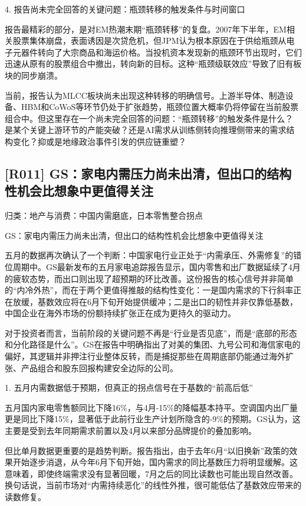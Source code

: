 \documentclass[11pt]{ctexart}
\begin{document}
4. 报告尚未完全回答的关键问题：瓶颈转移的触发条件与时间窗口

报告最精彩的部分，是对EM热潮末期“瓶颈转移”的复盘。2007年下半年，EM相关股票集体崩盘，表面诱因是次贷危机，但JPM认为根本原因在于供给瓶颈从电子元器件转向了大宗商品和海运价格。当投机资本发现新的瓶颈环节出现时，它们迅速从原有的股票组合中撤出，转向新的目标。这种“瓶颈级联效应”导致了旧有板块的同步崩溃。

当前，报告认为MLCC板块尚未出现这种转移的明确信号。上游半导体、制造设备、HBM和CoWoS等环节仍处于扩张趋势，瓶颈位置大概率仍将停留在当前股票组合中。但这里存在一个尚未完全回答的问题：“瓶颈转移”的触发条件是什么？ 是某个关键上游环节的产能突破？还是AI需求从训练侧转向推理侧带来的需求结构变化？抑或是地缘政治事件引发的供应链重塑？

\subsection{[R011] GS：家电内需压力尚未出清，但出口的结构性机会比想象中更值得关注}
{\small\color{refgray}归类：地产与消费：中国内需磨底，日本零售整合拐点}

GS：家电内需压力尚未出清，但出口的结构性机会比想象中更值得关注

五月的数据再次确认了一个判断：中国家电行业正处于“内需承压、外需修复”的错位周期中。GS最新发布的五月家电追踪报告显示，国内零售和出厂数据延续了4月的疲软态势，而出口则出现了超预期的环比改善。这份报告的核心信号并非简单的“内冷外热”，而在于两个更值得推敲的结构性变化：一是国内需求的下行斜率正在放缓，基数效应将在6月下旬开始提供缓冲；二是出口的韧性并非仅靠低基数，中国企业在海外市场的份额持续扩张正在成为更持久的驱动力。

对于投资者而言，当前阶段的关键问题不再是“行业是否见底”，而是“底部的形态和分化路径是什么”。GS在报告中明确指出了对美的集团、九号公司和海信家电的偏好，其逻辑并非押注行业整体反转，而是捕捉那些在周期底部仍能通过海外扩张、产品组合和股东回报构建安全边际的公司。

1. 五月内需数据低于预期，但真正的拐点信号在于基数的“前高后低”

五月国内家电零售额同比下降16\%，与4月-15\%的降幅基本持平。空调国内出厂量更是同比下降15\%，显著低于此前行业生产计划所隐含的-9\%的预期。GS认为，这主要是受到去年同期需求前置以及4月以来部分品牌提价的叠加影响。

但比单月数据更重要的是趋势判断。报告指出，由于去年6月“以旧换新”政策的效果开始逐步消退，从今年6月下旬开始，国内需求的同比基数压力将明显缓解。这意味着，即使终端需求没有显著回暖，7月之后的同比读数也可能出现自然改善。换句话说，当前市场对“内需持续恶化”的线性外推，很可能低估了基数效应带来的读数修复。
\end{document}
